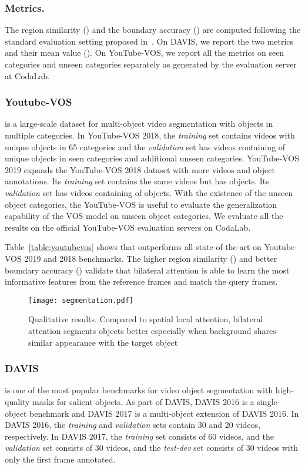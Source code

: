 \documentclass[runningheads]{llncs}
\begin{document}
\noindent\subsubsection{Metrics.}
The region similarity () and the boundary accuracy () are computed following the standard evaluation setting proposed in~\cite{perazzi2016benchmark}. On DAVIS, we report the two metrics and their mean value (). On YouTube-VOS, we report all the metrics on seen categories and unseen categories separately as generated by the evaluation server at CodaLab.

\noindent\subsubsection{Youtube-VOS~\cite{xu2018youtube}} is a large-scale dataset for multi-object video segmentation with objects in multiple categories. In YouTube-VOS 2018, the \textsl{training} set contains  videos with  unique objects in 65 categories and the \textsl{validation} set has  videos containing of  unique objects in  seen categories and additional  unseen categories. YouTube-VOS 2019 expands the YouTube-VOS 2018 dataset with more videos and object annotations. Its \textsl{training} set contains the same  videos but has  objects. Its \textsl{validation} set has  videos containing of  objects. With the existence of the unseen object categories, the YouTube-VOS is useful to evaluate the generalization capability of the VOS model on unseen object categories. We evaluate all the results on the official YouTube-VOS evaluation servers on CodaLab.

Table~\ref{table:youtubevos} shows that {\shortname} outperforms all state-of-the-art on Youtube-VOS 2019 and 2018 benchmarks. The higher region similarity () and better boundary accuracy () validate that bilateral attention is able to learn the most informative features from the reference frames and match the query frames.


\begin{figure}[t]
\centering
\texttt{[image: segmentation.pdf]}
\caption{Qualitative results. Compared to spatial local attention, bilateral attention segments objects better especially when background shares similar appearance with the target object}
\label{fig:segmentation}
\end{figure}

\subsubsection{DAVIS} is one of the most popular benchmarks for video object segmentation with high-quality masks for salient objects. As part of DAVIS, DAVIS 2016 \cite{perazzi2016benchmark} is a single-object benchmark and DAVIS 2017 \cite{pont20172017} is a multi-object extension of DAVIS 2016. In DAVIS 2016, the \textsl{training} and \textsl{validation} sets contain 30 and 20 videos, respectively. In DAVIS 2017, the \textsl{training} set consists of 60 videos, and the \textsl{validation} set consists of 30 videos, and the \textsl{test-dev} set consists of 30 videos with only the first frame annotated. 
\end{document}

